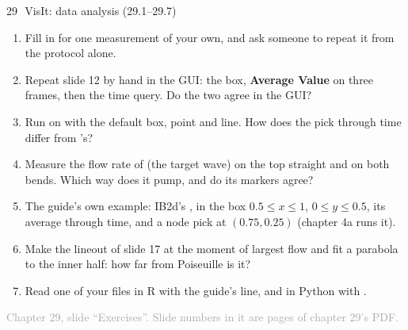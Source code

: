\documentclass[aspectratio=169,11pt]{beamer}
\newcommand{\sourcecredit}[1]{\vfill\begin{flushright}\tiny\textcolor{DarkGray}{#1}\end{flushright}}
\providecommand{\gui}[1]{\textsf{\textbf{#1}}}
\begin{document}
\begin{frame}{29\,\textbullet\ VisIt: data analysis (29.1--29.7)}
\label{fr:c29x1}
\footnotesize
\begin{enumerate}
  \item[29.1] Fill in  for one measurement of your own, and ask someone to repeat it from the protocol alone.
  \item[29.2] Repeat slide 12 by hand in the GUI: the box, \gui{Average Value} on three frames, then the time query. Do the two agree in the GUI?
  \item[29.3] Run  on  with the default box, point and line. How does the pick through time differ from 's?
  \item[29.4] Measure the flow rate of  (the target wave) on the top straight and on both bends. Which way does it pump, and do its markers agree?
  \item[29.5] The guide's own example: IB2d's ,  in the box $0.5 \le x \le 1$, $0 \le y \le 0.5$, its average through time, and a node pick at $(0.75, 0.25)$ (chapter 4a runs it).
  \item[29.6] Make the lineout of slide 17 at the moment of largest flow and fit a parabola to the inner half: how far from Poiseuille is it?
  \item[29.7] Read one of your  files in R with the guide's  line, and in Python with .
\end{enumerate}
\sourcecredit{Chapter 29, slide ``Exercises''. Slide numbers in it are pages of chapter 29's PDF.}
\end{frame}
\end{document}
